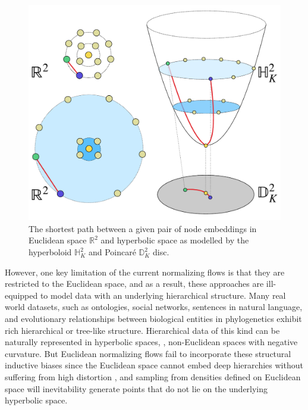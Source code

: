 \begin{figure}
    \centering
    \vspace{-10pt}
    \includegraphics[width=\linewidth]{explanatory_fig.pdf}
    \vspace{-10pt}
    \caption{The shortest path between a given pair of node embeddings in Euclidean space $\mathbb{R}^2$ and hyperbolic space as modelled by the hyperboloid $\mathbb{H}^2_K$ and Poincar\'e $\mathbb{D}^2_K$ disc. }
    \vspace{-10pt}
    \label{fig:my_label}
\end{figure}

However, one key limitation of the current normalizing flows is that they are restricted to the Euclidean space, and as a result, these approaches are ill-equipped to model data with an underlying hierarchical structure. %
Many real world datasets, such as ontologies, social networks, sentences in natural language, and evolutionary relationships between biological entities in phylogenetics exhibit rich hierarchical or tree-like structure.
Hierarchical data of this kind can be naturally represented in hyperbolic spaces, \ie, non-Euclidean spaces with negative curvature. 
But Euclidean normalizing flows fail to incorporate these structural inductive biases since the Euclidean space cannot embed deep hierarchies without suffering from high distortion \cite{sarkar2011low}, and sampling from densities defined on Euclidean space will inevitability generate points that do not lie on the underlying hyperbolic space. 

